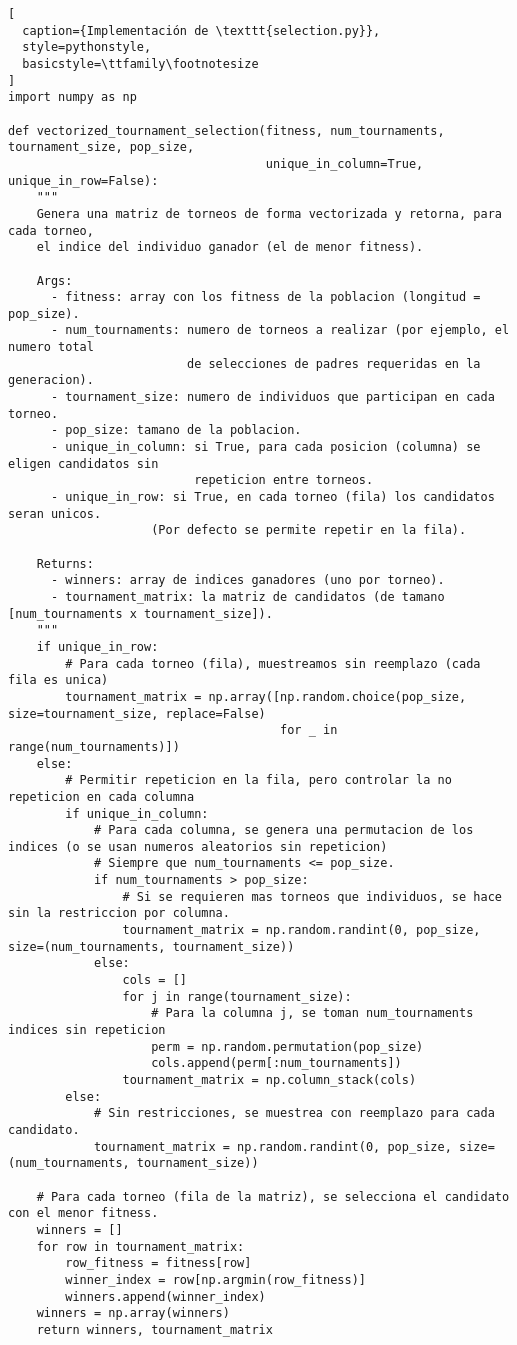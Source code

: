 \begin{lstlisting}[
  caption={Implementación de \texttt{selection.py}},
  style=pythonstyle,
  basicstyle=\ttfamily\footnotesize
]
import numpy as np

def vectorized_tournament_selection(fitness, num_tournaments, tournament_size, pop_size,
                                    unique_in_column=True, unique_in_row=False):
    """
    Genera una matriz de torneos de forma vectorizada y retorna, para cada torneo,
    el indice del individuo ganador (el de menor fitness).
    
    Args:
      - fitness: array con los fitness de la poblacion (longitud = pop_size).
      - num_tournaments: numero de torneos a realizar (por ejemplo, el numero total
                         de selecciones de padres requeridas en la generacion).
      - tournament_size: numero de individuos que participan en cada torneo.
      - pop_size: tamano de la poblacion.
      - unique_in_column: si True, para cada posicion (columna) se eligen candidatos sin
                          repeticion entre torneos.
      - unique_in_row: si True, en cada torneo (fila) los candidatos seran unicos.
                    (Por defecto se permite repetir en la fila).
    
    Returns:
      - winners: array de indices ganadores (uno por torneo).
      - tournament_matrix: la matriz de candidatos (de tamano [num_tournaments x tournament_size]).
    """
    if unique_in_row:
        # Para cada torneo (fila), muestreamos sin reemplazo (cada fila es unica)
        tournament_matrix = np.array([np.random.choice(pop_size, size=tournament_size, replace=False)
                                      for _ in range(num_tournaments)])
    else:
        # Permitir repeticion en la fila, pero controlar la no repeticion en cada columna
        if unique_in_column:
            # Para cada columna, se genera una permutacion de los indices (o se usan numeros aleatorios sin repeticion)
            # Siempre que num_tournaments <= pop_size.
            if num_tournaments > pop_size:
                # Si se requieren mas torneos que individuos, se hace sin la restriccion por columna.
                tournament_matrix = np.random.randint(0, pop_size, size=(num_tournaments, tournament_size))
            else:
                cols = []
                for j in range(tournament_size):
                    # Para la columna j, se toman num_tournaments indices sin repeticion
                    perm = np.random.permutation(pop_size)
                    cols.append(perm[:num_tournaments])
                tournament_matrix = np.column_stack(cols)
        else:
            # Sin restricciones, se muestrea con reemplazo para cada candidato.
            tournament_matrix = np.random.randint(0, pop_size, size=(num_tournaments, tournament_size))
    
    # Para cada torneo (fila de la matriz), se selecciona el candidato con el menor fitness.
    winners = []
    for row in tournament_matrix:
        row_fitness = fitness[row]
        winner_index = row[np.argmin(row_fitness)]
        winners.append(winner_index)
    winners = np.array(winners)
    return winners, tournament_matrix
\end{lstlisting}

